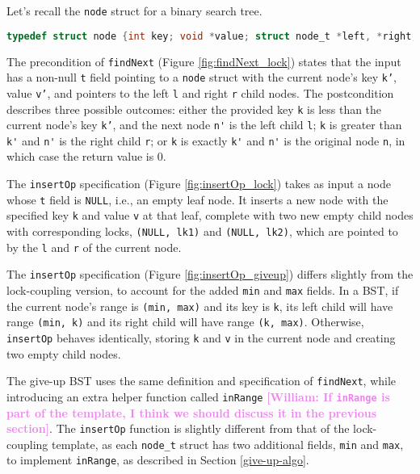 \documentclass[a4paper,UKenglish,cleveref, autoref, thm-restate]{lipics-v2021}
\newcommand{\wm}[1]{\textbf{\textcolor{violet}{[William: #1]}}}
\begin{document}
Let's recall the \texttt{node} struct for a binary search tree. 
\begin{lstlisting}[language = C, backgroundcolor=\color{white}, basicstyle=\ttfamily\footnotesize]
	typedef struct node {int key; void *value; struct node_t *left, *right;} node;
\end{lstlisting}
The precondition of \texttt{findNext} (Figure \ref*{fig:findNext_lock}) states that the input has a non-null \texttt{t} field pointing to a \texttt{node} struct with the current node's key \texttt{k'}, value \texttt{v'}, and pointers to the left \texttt{l} and right \texttt{r} child nodes. The postcondition describes three possible outcomes: either the provided key \texttt{k} is less than the current node's key \texttt{k'}, and the next node \lstinline{n'} is the left child \lstinline{l}; \lstinline{k} is greater than \lstinline{k'} and \lstinline{n'} is the right child \lstinline{r}; or \lstinline{k} is exactly \lstinline{k'} and \lstinline{n'} is the original node \lstinline{n}, in which case the return value is 0.

The \texttt{insertOp} specification (Figure \ref{fig:insertOp_lock}) takes as input a node whose \lstinline{t} field is \lstinline{NULL}, i.e., an empty leaf node. It inserts a new node with the specified key \texttt{k} and value \texttt{v} at that leaf, complete with two new empty child nodes with corresponding locks, \texttt{(NULL, lk1)} and \texttt{(NULL, lk2)}, which are pointed to by the \texttt{l} and \texttt{r} of the current node.  

The \texttt{insertOp} specification (Figure \ref{fig:insertOp_giveup}) differs slightly from the lock-coupling version, to account for the added \lstinline{min} and \lstinline{max} fields. In a BST, if the current node's range is \lstinline{(min, max)} and its key is \lstinline{k}, its left child will have range \texttt{(min, k)} and its right child will have range \texttt{(k, max)}. Otherwise, \lstinline{insertOp} behaves identically, storing \lstinline{k} and \lstinline{v} in the current node and creating two empty child nodes.

The give-up BST uses the same definition and specification of \texttt{findNext}, while introducing an extra helper function called \texttt{inRange} \wm{If \lstinline{inRange} is part of the template, I think we should discuss it in the previous section}. The \texttt{insertOp} function is slightly different from that of the lock-coupling template, as each \lstinline{node_t} struct has two additional fields, \texttt{min} and \texttt{max}, to implement \lstinline{inRange}, as described in Section \ref{give-up-algo}.
\end{document}

